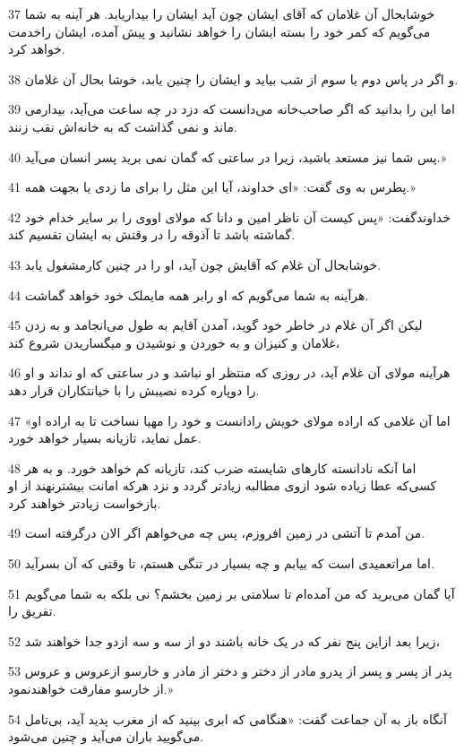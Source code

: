\par 37 خوشابحال آن غلامان که آقای ایشان چون آید ایشان را بیداریابد. هر آینه به شما می‌گویم که کمر خود را بسته ایشان را خواهد نشانید و پیش آمده، ایشان راخدمت خواهد کرد.
\par 38 و اگر در پاس دوم یا سوم از شب بیاید و ایشان را چنین یابد، خوشا بحال آن غلامان.
\par 39 اما این را بدانید که اگر صاحب‌خانه می‌دانست که دزد در چه ساعت می‌آید، بیدارمی ماند و نمی گذاشت که به خانه‌اش نقب زنند.
\par 40 پس شما نیز مستعد باشید، زیرا در ساعتی که گمان نمی برید پسر انسان می‌آید.»
\par 41 پطرس به وی گفت: «ای خداوند، آیا این مثل را برای ما زدی یا بجهت همه.»
\par 42 خداوندگفت: «پس کیست آن ناظر امین و دانا که مولای اووی را بر سایر خدام خود گماشته باشد تا آذوقه را در وقتش به ایشان تقسیم کند.
\par 43 خوشابحال آن غلام که آقایش چون آید، او را در چنین کارمشغول یابد.
\par 44 هرآینه به شما می‌گویم که او رابر همه مایملک خود خواهد گماشت.
\par 45 لیکن اگر آن غلام در خاطر خود گوید، آمدن آقایم به طول می‌انجامد و به زدن غلامان و کنیزان و به خوردن و نوشیدن و میگساریدن شروع کند،
\par 46 هرآینه مولای آن غلام آید، در روزی که منتظر او نباشد و در ساعتی که او نداند و او را دوپاره کرده نصیبش را با خیانتکاران قرار دهد.
\par 47 «اما آن غلامی که اراده مولای خویش رادانست و خود را مهیا نساخت تا به اراده او عمل نماید، تازیانه بسیار خواهد خورد.
\par 48 اما آنکه نادانسته کارهای شایسته ضرب کند، تازیانه کم خواهد خورد. و به هر کسی‌که عطا زیاده شود ازوی مطالبه زیادتر گردد و نزد هر‌که امانت بیشترنهند از او بازخواست زیادتر خواهند کرد.
\par 49 من آمدم تا آتشی در زمین افروزم، پس چه می‌خواهم اگر الان در‌گرفته است.
\par 50 اما مراتعمیدی است که بیابم و چه بسیار در تنگی هستم، تا وقتی که آن بسر‌آید.
\par 51 آیا گمان می‌برید که من آمده‌ام تا سلامتی بر زمین بخشم؟ نی بلکه به شما می‌گویم تفریق را.
\par 52 زیرا بعد ازاین پنج نفر که در یک خانه باشند دو از سه و سه ازدو جدا خواهند شد،
\par 53 پدر از پسر و پسر از پدرو مادر از دختر و دختر از مادر و خارسو ازعروس و عروس از خارسو مفارقت خواهندنمود.»
\par 54 آنگاه باز به آن جماعت گفت: «هنگامی که ابری بینید که از مغرب پدید آید، بی‌تامل می‌گویید باران می‌آید و چنین می‌شود.
